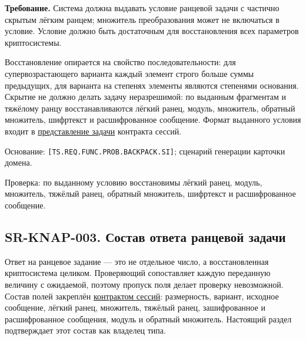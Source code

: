 \documentclass[12pt,a4paper]{article}
\begin{document}
\textbf{Требование.} Система должна выдавать условие ранцевой задачи с частично скрытым лёгким ранцем; множитель преобразования может не включаться в условие. Условие должно быть достаточным для восстановления всех параметров криптосистемы.

Восстановление опирается на свойство последовательности: для супервозрастающего варианта каждый элемент строго больше суммы предыдущих, для варианта на степенях элементы являются степенями основания. Скрытие не должно делать задачу неразрешимой: по выданным фрагментам и тяжёлому ранцу восстанавливаются лёгкий ранец, модуль, множитель, обратный множитель, шифртекст и расшифрованное сообщение. Формат выданного условия входит в \href{../07_\%D0\%9F\%D1\%80\%D0\%BE\%D0\%B3\%D1\%80\%D0\%B0\%D0\%BC\%D0\%BC\%D0\%BD\%D1\%8B\%D0\%B5_\%D1\%82\%D1\%80\%D0\%B5\%D0\%B1\%D0\%BE\%D0\%B2\%D0\%B0\%D0\%BD\%D0\%B8\%D1\%8F/DOC-06.2_\%D0\%A1\%D0\%B5\%D1\%81\%D1\%81\%D0\%B8\%D0\%B8_\%D0\%B7\%D0\%B0\%D0\%B4\%D0\%B0\%D1\%87_\%D0\%B8_\%D0\%BF\%D0\%BB\%D0\%B0\%D0\%BD\%D0\%B8\%D1\%80\%D0\%BE\%D0\%B2\%D1\%89\%D0\%B8\%D0\%BA.pdf\#nameddest=\%D0\%BF\%D1\%80\%D0\%B5\%D0\%B4\%D1\%81\%D1\%82\%D0\%B0\%D0\%B2\%D0\%BB\%D0\%B5\%D0\%BD\%D0\%B8\%D0\%B5-\%D1\%81\%D0\%B5\%D1\%81\%D1\%81\%D0\%B8\%D0\%B8-\%D0\%B8-\%D0\%B7\%D0\%B0\%D0\%B4\%D0\%B0\%D1\%87\%D0\%B8}{представление задачи} контракта сессий.

Основание: \texttt{[TS.\allowbreak{}REQ.\allowbreak{}FUNC.\allowbreak{}PROB.\allowbreak{}BACKPACK.\allowbreak{}SI]}; сценарий генерации карточки домена.

Проверка: по выданному условию восстановимы лёгкий ранец, модуль, множитель, тяжёлый ранец, обратный множитель, шифртекст и расшифрованное сообщение.

\subsection{SR-KNAP-003. Состав ответа ранцевой задачи}\label{sr-knap-003-ux441ux43eux441ux442ux430ux432-ux43eux442ux432ux435ux442ux430-ux440ux430ux43dux446ux435ux432ux43eux439-ux437ux430ux434ux430ux447ux438}

\hypertarget{sr-knap-003-состав-ответа-ранцевой-задачи}{}

Ответ на ранцевое задание --- это не отдельное число, а восстановленная криптосистема целиком. Проверяющий сопоставляет каждую переданную величину с ожидаемой, поэтому пропуск поля делает проверку невозможной. Состав полей закреплён \href{../07_\%D0\%9F\%D1\%80\%D0\%BE\%D0\%B3\%D1\%80\%D0\%B0\%D0\%BC\%D0\%BC\%D0\%BD\%D1\%8B\%D0\%B5_\%D1\%82\%D1\%80\%D0\%B5\%D0\%B1\%D0\%BE\%D0\%B2\%D0\%B0\%D0\%BD\%D0\%B8\%D1\%8F/DOC-06.2_\%D0\%A1\%D0\%B5\%D1\%81\%D1\%81\%D0\%B8\%D0\%B8_\%D0\%B7\%D0\%B0\%D0\%B4\%D0\%B0\%D1\%87_\%D0\%B8_\%D0\%BF\%D0\%BB\%D0\%B0\%D0\%BD\%D0\%B8\%D1\%80\%D0\%BE\%D0\%B2\%D1\%89\%D0\%B8\%D0\%BA.pdf\#nameddest=\%D1\%80\%D0\%B0\%D0\%BD\%D1\%86\%D0\%B5\%D0\%B2\%D0\%B0\%D1\%8F-\%D0\%B7\%D0\%B0\%D0\%B4\%D0\%B0\%D1\%87\%D0\%B0}{контрактом сессий}: размерность, вариант, исходное сообщение, лёгкий ранец, множитель, тяжёлый ранец, зашифрованное и расшифрованное сообщения, модуль и обратный множитель. Настоящий раздел подтверждает этот состав как владелец типа.
\end{document}
